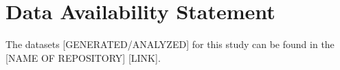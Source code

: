\documentclass[utf8]{FrontiersinHarvard} %
\begin{document}
\section*{Data Availability Statement}
The datasets [GENERATED/ANALYZED] for this study can be found in the [NAME OF REPOSITORY] [LINK].


\end{document}
